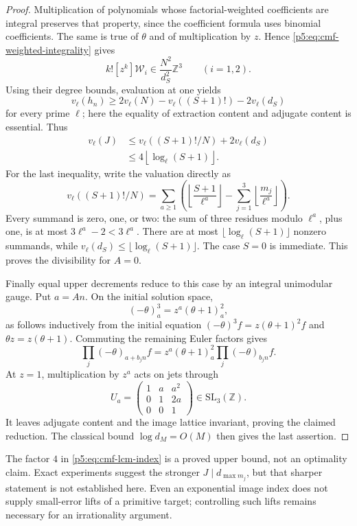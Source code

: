 \documentclass[11pt,a4paper]{article}
\theoremstyle{definition}
\theoremstyle{remark}
\numberwithin{equation}{section}
\begin{document}
\begin{proof}
Multiplication of polynomials whose factorial-weighted coefficients
are integral preserves that property, since the coefficient formula
uses binomial coefficients. The same is true of $\theta$ and of
multiplication by $z$. Hence \eqref{p5:eq:cmf-weighted-integrality} gives
\[
 k![z^k]\mathcal W_i\in\frac{N^2}{d_S^2}\mathbb Z^3
 \qquad(i=1,2).
\]
Using their degree bounds, evaluation at one yields
\[
 v_\ell(h_n)\ge
 2v_\ell(N)-v_\ell((S+1)!)-2v_\ell(d_S)
\]
for every prime $\ell$; here the equality of extraction content and
adjugate content is essential. Thus
\begin{align*}
 v_\ell(J)
 &\le v_\ell((S+1)!/N)+2v_\ell(d_S)\\
 &\le 4\left\lfloor\log_\ell(S+1)\right\rfloor.
\end{align*}
For the last inequality, write the valuation directly as
\[
 v_\ell((S+1)!/N)=\sum_{a\ge1}\left(
 \left\lfloor\frac{S+1}{\ell^a}\right\rfloor
 -\sum_{j=1}^3\left\lfloor\frac{m_j}{\ell^a}\right\rfloor\right).
\]
Every summand is zero, one, or two: the sum of three residues
modulo $\ell^a$, plus one, is at most $3\ell^a-2<3\ell^a$.
There are at most $\lfloor\log_\ell(S+1)\rfloor$ nonzero
summands, while $v_\ell(d_S)\le\lfloor\log_\ell(S+1)\rfloor$.
The case $S=0$ is immediate. This proves the divisibility for $A=0$.

Finally equal upper decrements reduce to this case by an integral
unimodular gauge. Put $a=An$. On the initial solution space,
\[
 (-\theta)_a^3=z^a(\theta+1)_a^2,
\]
as follows inductively from the initial equation
$(-\theta)^3f=z(\theta+1)^2f$ and $\theta z=z(\theta+1)$.
Commuting the remaining Euler factors gives
\[
 \prod_j(-\theta)_{a+b_jn}f
   =z^a(\theta+1)_a^2\prod_j(-\theta)_{b_jn}f.
\]
At $z=1$, multiplication by $z^a$ acts on jets through
\[
 U_a=\begin{pmatrix}1&a&a^2\\0&1&2a\\0&0&1\end{pmatrix}
 \in\mathrm{SL}_3(\mathbb Z).
\]
It leaves adjugate content and the image lattice invariant, proving
the claimed reduction. The classical bound $\log d_M=O(M)$ then
gives the last assertion.
\end{proof}

The factor $4$ in \eqref{p5:eq:cmf-lcm-index} is a proved upper bound,
not an optimality claim. Exact experiments suggest the stronger
$J\mid d_{\max m_j}$, but that sharper statement is not established
here. Even an exponential image index does not supply small-error
lifts of a primitive target; controlling such lifts remains necessary
for an irrationality argument.
\end{document}
